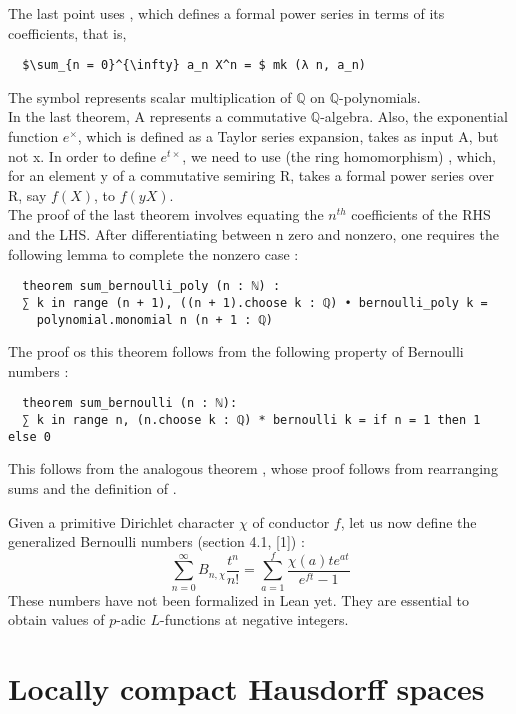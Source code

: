 \documentclass[11pt]{article}
\begin{document}
The last point uses , which defines a formal power series in terms of its
coefficients, that is,
\begin{lstlisting}
  $\sum_{n = 0}^{\infty} a_n X^n = $ mk (λ n, a_n)
\end{lstlisting}
The symbol  represents scalar multiplication of $\mathbb{Q}$ on $\mathbb{Q}$-polynomials. \\
In the last theorem, A represents a commutative $\mathbb{Q}$-algebra.
Also, the exponential function $e^{\times}$, which is defined as a Taylor series expansion,
takes as input A, but not x. In order to define $e^{t\times}$, we need to use
(the ring homomorphism) , which, for an element y of a commutative semiring R,
takes a formal power series over R, say $f(X)$, to $f(yX)$. \\

The proof of the last theorem involves equating the $n^{th}$ coefficients of the RHS and the LHS.
After differentiating between n zero and nonzero, one requires the following lemma to complete the
nonzero case :
\begin{lstlisting}
  theorem sum_bernoulli_poly (n : ℕ) :
  ∑ k in range (n + 1), ((n + 1).choose k : ℚ) • bernoulli_poly k =
    polynomial.monomial n (n + 1 : ℚ)
\end{lstlisting}

The proof os this theorem follows from the following property of Bernoulli numbers :

\begin{lstlisting}
  theorem sum_bernoulli (n : ℕ):
  ∑ k in range n, (n.choose k : ℚ) * bernoulli k = if n = 1 then 1 else 0
\end{lstlisting}

This follows from the analogous theorem , whose proof follows from rearranging
sums and the definition of .

Given a primitive Dirichlet character $\chi$ of conductor $f$, let us now define the generalized
Bernoulli numbers (section 4.1, [1]) :
$$ \sum_{n = 0}^{\infty} B_{n,\chi} \frac{t^n}{n!} = \sum_{a = 1}^f \frac{\chi(a)t e^{at}}{e^{ft} - 1} $$
These numbers have not been formalized in Lean yet. They are essential to obtain values of $p$-adic
$L$-functions at negative integers.

\section{Locally compact Hausdorff spaces}
\end{document}
